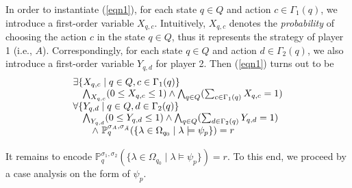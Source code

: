 \documentclass[times, 10 pt,twocolumn]{article}
\newcommand{\mb}[1]{\mathbb{#1}}
\begin{document}
\noindent In order to instantiate (\ref{eqn1}), for each state
$q\in Q$ and action $c\in \Gamma_1(q)$, we introduce a first-order
variable $X_{q,c}$. Intuitively, $X_{q,c}$ denotes the
\emph{probability} of choosing the action $c$ in the state $q\in
Q$, thus it represents the strategy of player 1 (i.e., $A$).
Correspondingly, for each state $q\in Q$ and action $d\in
\Gamma_2(q)$, we also introduce a first-order variable $Y_{q,d}$
for player 2. %
Then (\ref{eqn1}) turns out to be
%
\[%
\begin{array}{l}
  \exists \{X_{q,c}\mid q\in Q, c\in \Gamma_1(q)\}\\
  \quad \bigwedge_{X_{q,c}}(0\leq X_{q,c}\leq 1)\wedge
    \bigwedge_{q\in Q}(\sum_{c\in \Gamma_1(q)} X_{q,c}= 1)\\
  \forall \{Y_{q,d}\mid q\in Q, d\in \Gamma_2(q)\} \\
  \quad \bigwedge_{Y_{q,d}}(0\leq Y_{q,d}\leq 1)\wedge
    \bigwedge_{q\in Q}(\sum_{d\in \Gamma_2(q)} Y_{q,d}= 1)\\
 \vspace{2mm}
  \qquad \wedge\ \mb{P}^{\sigma_A,\sigma_{\bar{A}}}_q (\{\lambda\in
\Omega_{q_0}\mid\lambda \models \psi_p\}) = r
\end{array}
\]
It remains to encode $\mb{P}^{\sigma_1,\sigma_2}_q (\{\lambda\in
\Omega_{q_0}\mid\lambda \models \psi_p\}) = r$. To this end, we
proceed by a case analysis on the form of $\psi_p$.
%
\end{document}
